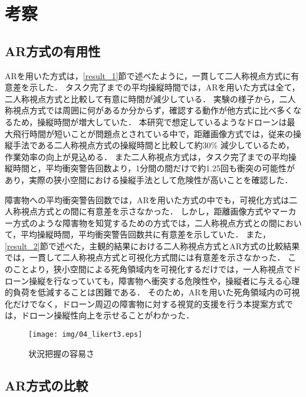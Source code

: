 \documentclass[submit]{ipsj}
\begin{document}
\section{考察}
\subsection{AR方式の有用性}
ARを用いた方式は，\ref{result_1}節で述べたように，一貫して二人称視点方式に有意差を示した．
タスク完了までの平均操縦時間では，ARを用いた方式は全て，二人称視点方式と比較して有意に時間が減少している．
実験の様子から，二人称視点方式では周囲に何があるか分からず，確認する動作が他方式に比べ多くなるため，操縦時間が増大していた．
本研究で想定しているようなドローンは最大飛行時間が短いことが問題点とされている中で\cite{article-drone14}\cite{article-drone15}\cite{article-drone16}，距離画像方式では，従来の操縦手法である二人称視点方式の操縦時間と比較して約30\% 減少しているため，作業効率の向上が見込める．
また二人称視点方式は，タスク完了までの平均操縦時間と，平均衝突警告回数より，1分間の間だけで約1.25回も衝突の可能性があり，実際の狭小空間における操縦手法として危険性が高いことを確認した．
\par
障害物への平均衝突警告回数では，ARを用いた方式の中でも，可視化方式は二人称視点方式との間に有意差を示さなかった．
しかし，距離画像方式やマーカー方式のような障害物を知覚するための方式では，二人称視点方式との間において，平均操縦時間，平均衝突警告回数共に有意差を示していた．
また，\ref{result_2}節で述べた，主観的結果における二人称視点方式とAR方式の比較結果では，一貫して二人称視点方式と可視化方式間には有意差を示さなかった．
このことより，狭小空間による死角領域内を可視化するだけでは，一人称視点でドローン操縦を行なっていても，障害物へ衝突する危険性や，操縦者に与える心理的負荷を低減することは困難である．
そのため，ARを用いた死角領域内の可視化だけでなく，ドローン周辺の障害物に対する視覚的支援を行う本提案方式では，ドローン操縦性向上を示せることがわかった．


\begin{figure}[tb]
  \centering
  \texttt{[image: img/04\_likert3.eps]}
  \caption{状況把握の容易さ}
  \label{fig:04_likert3}
  \end{figure}


\subsection{AR方式の比較}
\end{document}
